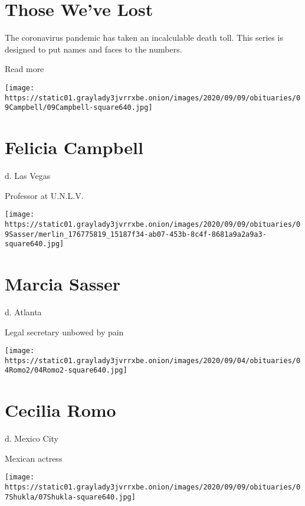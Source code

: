 \href{https://www.nytimes3xbfgragh.onion/interactive/2020/obituaries/people-died-coronavirus-obituaries.html?action=click\&pgtype=Article\&state=default\&region=BELOW_MAIN_CONTENT\&context=covid_obits_promo}{}

\hypertarget{those-weve-lost}{%
\section{Those We've Lost}\label{those-weve-lost}}

The coronavirus pandemic has taken an incalculable death toll. This
series is designed to put names and faces to the numbers.

Read more

\texttt{[image: https://static01.graylady3jvrrxbe.onion/images/2020/09/09/obituaries/09Campbell/09Campbell-square640.jpg]}

\hypertarget{felicia-campbell}{%
\section{Felicia Campbell}\label{felicia-campbell}}

d. Las Vegas

Professor at U.N.L.V.

\texttt{[image: https://static01.graylady3jvrrxbe.onion/images/2020/09/09/obituaries/09Sasser/merlin\_176775819\_15187f34-ab07-453b-8c4f-8681a9a2a9a3-square640.jpg]}

\hypertarget{marcia-sasser}{%
\section{Marcia Sasser}\label{marcia-sasser}}

d. Atlanta

Legal secretary unbowed by pain

\texttt{[image: https://static01.graylady3jvrrxbe.onion/images/2020/09/04/obituaries/04Romo2/04Romo2-square640.jpg]}

\hypertarget{cecilia-romo}{%
\section{Cecilia Romo}\label{cecilia-romo}}

d. Mexico City

Mexican actress

\texttt{[image: https://static01.graylady3jvrrxbe.onion/images/2020/09/09/obituaries/07Shukla/07Shukla-square640.jpg]}

